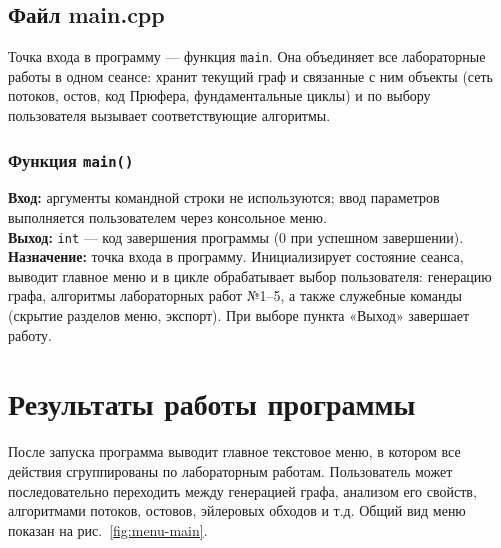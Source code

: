 \documentclass[14pt,a4paper]{extarticle}
\newcommand{\funcblock}[5]{%
\subsubsection*{Метод \code{#1}}
\noindent
\textbf{Вход:} #2\\
\textbf{Выход:} #3\\
\textbf{Описание:} #4\\
Код представлен в листинге~\ref{#5}.%
}
\newcommand{\mainfuncblock}[4]{%
\subsubsection*{Функция \code{#1}}
\noindent
\textbf{Вход:} #2\\
\textbf{Выход:} #3\\
\textbf{Назначение:} #4%
}
\newcommand{\code}[1]{\texttt{#1}}
\begin{document}

\subsection{Файл main.cpp}

Точка входа в программу --- функция \code{main}. Она объединяет все лабораторные работы в одном сеансе: хранит текущий граф и связанные с ним объекты (сеть потоков, остов, код Прюфера, фундаментальные циклы) и по выбору пользователя вызывает соответствующие алгоритмы.

\mainfuncblock
{main()}
{аргументы командной строки не используются; ввод параметров выполняется пользователем через консольное меню.}
{\code{int} --- код завершения программы (\(0\) при успешном завершении).}
{точка входа в программу. Инициализирует состояние сеанса, выводит главное меню и в цикле обрабатывает выбор пользователя: генерацию графа, алгоритмы лабораторных работ №1--5, а также служебные команды (скрытие разделов меню, экспорт). При выборе пункта «Выход» завершает работу.}

\newpage
\section{Результаты работы программы}


После запуска программа выводит главное текстовое меню, в котором все действия сгруппированы по лабораторным работам. Пользователь может последовательно переходить между генерацией графа, анализом его свойств, алгоритмами потоков, остовов, эйлеровых обходов и т.д. Общий вид меню показан на рис.~\ref{fig:menu-main}.
\end{document}
